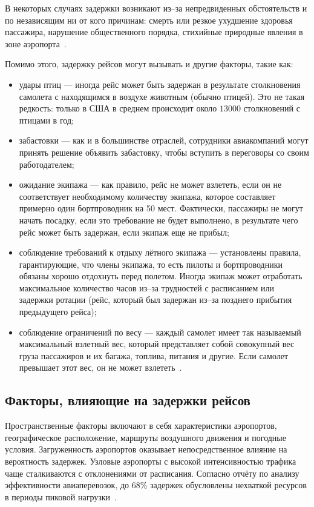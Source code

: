 В некоторых случаях задержки возникают из--за непредвиденных обстоятельств и по независящим ни от кого причинам: смерть или резкое ухудшение здоровья пассажира, нарушение общественного порядка, стихийные природные явления в зоне аэропорта~\cite{voronov}.

Помимо этого, задержку рейсов могут вызывать и другие факторы, такие как:
\begin{itemize}[label=---]
    \item удары птиц --- иногда рейс может быть задержан в результате столкновения самолета с находящимся в воздухе животным (обычно птицей).
    Это не такая редкость: только в США в среднем происходит около $13 000$ столкновений с птицами в год;
    \item забастовки --- как и в большинстве отраслей, сотрудники авиакомпаний могут принять решение объявить забастовку, чтобы вступить в переговоры со своим работодателем;
    \item ожидание экипажа --- как правило, рейс не может взлететь, если он не соответствует необходимому количеству экипажа, которое составляет примерно один бортпроводник на 50 мест.
    Фактически, пассажиры не могут начать посадку, если это требование не будет выполнено, в результате чего рейс может быть задержан, если экипаж еще не прибыл;
    \item соблюдение требований к отдыху лётного экипажа --- установлены правила, гарантирующие, что члены экипажа, то есть пилоты и бортпроводники обязаны хорошо отдохнуть перед полетом.
    Иногда экипаж может отработать максимальное количество часов из--за трудностей с расписанием или задержки ротации (рейс, который был задержан из--за позднего прибытия предыдущего рейса);
    \item соблюдение ограничений по весу --- каждый самолет имеет так называемый максимальный взлетный вес, который представляет собой совокупный вес груза пассажиров и их багажа, топлива, питания и другие.
    Если самолет превышает этот вес, он не может взлететь~\cite{voronov}.
\end{itemize}


\subsection*{Факторы, влияющие на задержки рейсов}

Пространственные факторы включают в себя характеристики аэропортов, географическое расположение, маршруты воздушного движения и погодные условия.
Загруженность аэропортов оказывает непосредственное влияние на вероятность задержек.
Узловые аэропорты с высокой интенсивностью трафика чаще сталкиваются с отклонениями от расписания.
Согласно отчёту по анализу эффективности авиаперевозок, до 68\% задержек обусловлены нехваткой ресурсов в периоды пиковой нагрузки~\cite{eurocontrol}.


